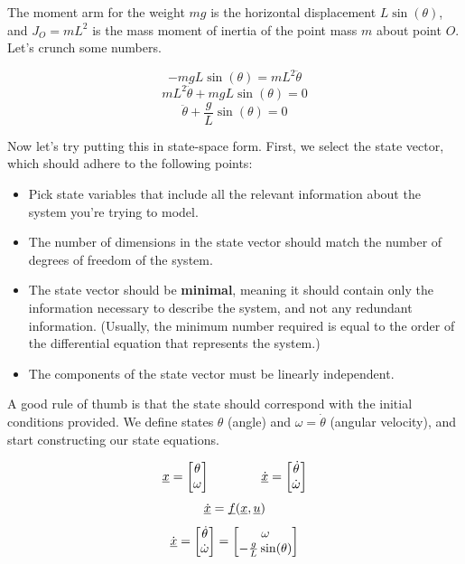 \documentclass{report}
\begin{document}
\begin{onehalfspacing}
\begin{flushleft}
The moment arm for the weight \(mg\) is the horizontal displacement \(L \sin(\theta)\), and \(J_O = mL^2\) is the mass moment of inertia of the point mass \(m\) about point \(O\). Let's crunch some numbers.

\vspace{-0.1in}
\[-mgL \sin(\theta) = mL^2 \ddot{\theta}\]
\[mL^2 \ddot{\theta} + mgL \sin(\theta) = 0\]
\[\ddot{\theta} + \frac{g}{L} \sin(\theta) = 0\]

Now let's try putting this in state-space form. First, we select the state vector, which should adhere to the following points:

\begin{itemize}[noitemsep]
    \item Pick state variables that include all the relevant information about the system you're trying to model.
    \item The number of dimensions in the state vector should match the number of degrees of freedom of the system.
    \item The state vector should be \textbf{minimal}, meaning it should contain only the information necessary to describe the system, and not any redundant information. (Usually, the minimum number required is equal to the order of the differential equation that represents the system.)
    \item The components of the state vector must be linearly independent.
\end{itemize}

A good rule of thumb is that the state should correspond with the initial conditions provided. We define states \(\theta\) (angle) and \(\omega = \dot{\theta}\) (angular velocity), and start constructing our state equations.

\vspace{-0.1in}
\[\underbar{\(x\)} = \begin{bmatrix}
    \theta \\
    \omega  \end{bmatrix} \qquad \qquad \underbar{\(\dot{x}\)} = \begin{bmatrix}
        \dot{\theta} \\
        \dot{\omega}  \end{bmatrix}\]
\[\underbar{\(\dot{x}\)} = \underbar{\(f\)} (\underbar{\(x\)}, \underbar{\(u\)})\]
\vspace{-0.1in}
\[\dot{\underbar{\(x\)}} = \begin{bmatrix}
    \dot{\theta} \\
    \dot{\omega}  \end{bmatrix} = \begin{bmatrix}
    \omega \\
    -\frac{g}{L} \sin(\theta) 
\end{bmatrix}\]


\end{flushleft}
\end{onehalfspacing}
\end{document}
